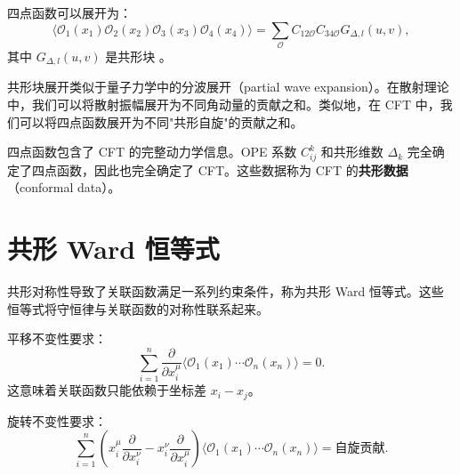\begin{theorem}[共形块展开]
四点函数可以展开为：
\begin{equation}
    \langle \mathcal{O}_1(x_1) \mathcal{O}_2(x_2) \mathcal{O}_3(x_3) \mathcal{O}_4(x_4) \rangle = \sum_{\mathcal{O}} C_{12\mathcal{O}} C_{34\mathcal{O}} G_{\Delta, l}(u, v),
\end{equation}
其中 $G_{\Delta, l}(u, v)$ 是共形块 \cite{Aharony1999}。
\end{theorem}

\begin{note}[物理解释]
共形块展开类似于量子力学中的分波展开（partial wave expansion）。在散射理论中，我们可以将散射振幅展开为不同角动量的贡献之和。类似地，在 CFT 中，我们可以将四点函数展开为不同"共形自旋"的贡献之和。
\end{note}

\begin{remark}
四点函数包含了 CFT 的完整动力学信息。OPE 系数 $C_{ij}^k$ 和共形维数 $\Delta_k$ 完全确定了四点函数，因此也完全确定了 CFT。这些数据称为 CFT 的\textbf{共形数据}（conformal data）。
\end{remark}

\section{共形 Ward 恒等式}

共形对称性导致了关联函数满足一系列约束条件，称为共形 Ward 恒等式。这些恒等式将守恒律与关联函数的对称性联系起来。

\begin{theorem}
平移不变性要求：
\begin{equation}
    \sum_{i=1}^n \frac{\partial}{\partial x_i^\mu} \langle \mathcal{O}_1(x_1) \cdots \mathcal{O}_n(x_n) \rangle = 0.
\end{equation}
这意味着关联函数只能依赖于坐标差 $x_i - x_j$。
\end{theorem}

\begin{theorem}
旋转不变性要求：
\begin{equation}
    \sum_{i=1}^n \left( x_i^\mu \frac{\partial}{\partial x_i^\nu} - x_i^\nu \frac{\partial}{\partial x_i^\mu} \right) \langle \mathcal{O}_1(x_1) \cdots \mathcal{O}_n(x_n) \rangle = \text{自旋贡献}.
\end{equation}
\end{theorem}


